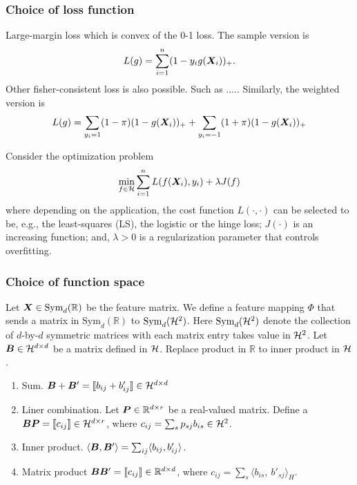 \documentclass[12pt]{article}
\begin{document}
\subsubsection{Choice of loss function}
Large-margin loss which is convex of the 0-1 loss. The sample version is
\[
L(g)=\sum_{i=1}^n (1-y_ig(\bm X_i))_{+}.
\]
Other fisher-consistent loss is also possible. Such as ..... 
Similarly, the weighted version is 
\[
L(g)=\sum_{y_i=1}(1-\pi)(1-g(\bm X_i))_{+}+\sum_{y_i=-1}(1+\pi)(1-g(\bm X_i))_{+}
\]

Consider the optimization problem
\[
\min_{f\in \mathcal{H}} \sum_{i=1}^n L(f(\bm X_i),y_i)+\lambda J(f)
\]
where depending on the application, the cost function $L(\cdot, \cdot)$ can be selected to be, e.g., the least-squares (LS), the logistic or the hinge loss; $J(\cdot)$ is an increasing function; and, $\lambda >0$ is a regularization parameter that controls overfitting. 

\subsubsection{Choice of function space}

Let $\bm X\in\text{Sym}_d(\mathbb{R})$ be the feature matrix. We define a feature mapping $\Phi$ that sends a matrix in $\text{Sym}_d(\mathbb{R})$ to $\text{Sym}_d(\mathcal{H}^2)$. Here $\text{Sym}_d(\mathcal{H}^2)$ denote the collection of $d$-by-$d$ symmetric matrices with each matrix entry takes value in $\mathcal{H}^2$. 
Let $\bm B\in\mathcal{H}^{d\times d}$ be a matrix defined in $\mathcal{H}$. Replace product in $\mathbb{R}$ to inner product in $\mathcal{H}$. 

\begin{enumerate}
\item Sum. $\bm B+\bm B'=\llbracket b_{ij}+b'_{ij} \rrbracket\in\mathcal{H}^{d\times d}$
\item Liner combination. Let $\bm{P}\in\mathbb{R}^{d\times r}$ be a real-valued matrix. Define a $\bm B\bm{P}=\llbracket c_{ij} \rrbracket\in\mathcal{H}^{d\times r}$, where $c_{ij}=\sum_{s}p_{sj}b_{is} \in \mathcal{H}^2$.
\item Inner product. $\langle \bm B,\bm B'\rangle=\sum_{ij}\langle b_{ij}, b'_{ij}\rangle$.
\item Matrix product $\bm B\bm B'=\llbracket c_{ij} \rrbracket \in \mathbb{R}^{d\times d}$, where $c_{ij}=\sum_{s}\langle b_{is},\ b'_{sj}\rangle_H$. 
\end{enumerate}
\end{document}
